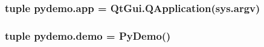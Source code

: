 \subsubsection[{app}]{\setlength{\rightskip}{0pt plus 5cm}tuple pydemo.\+app = Qt\+Gui.\+Q\+Application(sys.\+argv)}\label{namespacepydemo_a2e570ae54f89f2e5048a4e536f2d9ea6}
\hypertarget{namespacepydemo_ae1a6de8aa7dc09318d5b94e0297aa9a9}{}
\subsubsection[{demo}]{\setlength{\rightskip}{0pt plus 5cm}tuple pydemo.\+demo = {\bf Py\+Demo}()}\label{namespacepydemo_ae1a6de8aa7dc09318d5b94e0297aa9a9}
